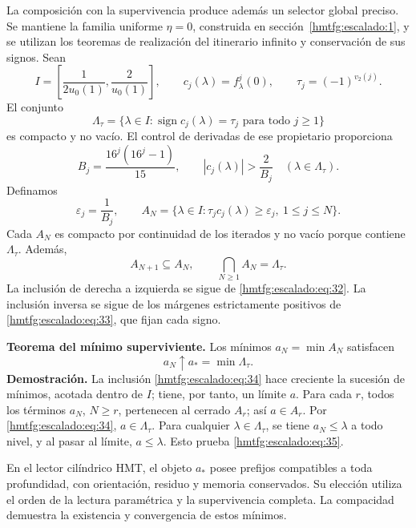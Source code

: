 La composición con la supervivencia produce además un selector global preciso. Se mantiene la familia uniforme \(\eta=0\), construida en sección~\ref{hmtfg:escalado:1}, y se utilizan los teoremas de realización del itinerario infinito y conservación de sus signos. Sean
\[
I=\left[\frac1{2u_0(1)},\frac2{u_0(1)}\right],\qquad
c_j(\lambda)=f_\lambda^j(0),\qquad
\tau_j=(-1)^{v_2(j)}.
\]
El conjunto
\[
\Lambda_\tau=\{\lambda\in I:\operatorname{sign}c_j(\lambda)=\tau_j
\text{ para todo }j\ge1\}
\]
es compacto y no vacío. El control de derivadas de ese propietario proporciona
\begin{equation}
B_j=\frac{16^j(16^j-1)}{15},\qquad
|c_j(\lambda)|>\frac2{B_j}\quad(\lambda\in\Lambda_\tau).
\label{hmtfg:escalado:eq:32}
\end{equation}
Definamos
\begin{equation}
\varepsilon_j=\frac1{B_j},\qquad
A_N=\{\lambda\in I:\tau_jc_j(\lambda)\ge\varepsilon_j,\
1\le j\le N\}.
\label{hmtfg:escalado:eq:33}
\end{equation}
Cada \(A_N\) es compacto por continuidad de los iterados y no vacío porque contiene \(\Lambda_\tau\). Además,
\begin{equation}
A_{N+1}\subseteq A_N,\qquad
\bigcap_{N\ge1}A_N=\Lambda_\tau.
\label{hmtfg:escalado:eq:34}
\end{equation}
La inclusión de derecha a izquierda se sigue de \eqref{hmtfg:escalado:eq:32}. La inclusión inversa se sigue de los márgenes estrictamente positivos de \eqref{hmtfg:escalado:eq:33}, que fijan cada signo.

\textbf{Teorema del mínimo superviviente.} Los mínimos \(a_N=\min A_N\) satisfacen
\begin{equation}
\boxed{a_N\uparrow a_*=\min\Lambda_\tau.}
\label{hmtfg:escalado:eq:35}
\end{equation}
\textbf{Demostración.} La inclusión \eqref{hmtfg:escalado:eq:34} hace creciente la sucesión de mínimos, acotada dentro de \(I\); tiene, por tanto, un límite \(a\). Para cada \(r\), todos los términos \(a_N\), \(N\ge r\), pertenecen al cerrado \(A_r\); así \(a\in A_r\). Por \eqref{hmtfg:escalado:eq:34}, \(a\in\Lambda_\tau\). Para cualquier \(\lambda\in\Lambda_\tau\), se tiene \(a_N\le\lambda\) a todo nivel, y al pasar al límite, \(a\le\lambda\). Esto prueba \eqref{hmtfg:escalado:eq:35}.

En el lector cilíndrico HMT, el objeto \(a_*\) posee prefijos compatibles a toda profundidad, con orientación, residuo y memoria conservados. Su elección utiliza el orden de la lectura paramétrica y la supervivencia completa. La compacidad demuestra la existencia y convergencia de estos mínimos.

